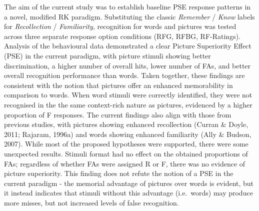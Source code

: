 \documentclass[
  11pt,
]{article}
\begin{document}
The aim of the current study was to establish baseline PSE response
patterns in a novel, modified RK paradigm. Substituting the classic
\emph{Remember} / \emph{Know} labels for \emph{Recollection} /
\emph{Familiarity}, recognition for words and pictures was tested across
three separate response option conditions (RFG, RFBG, RF-Ratings).
Analysis of the behavioural data demonstrated a clear Picture
Superiority Effect (PSE) in the current paradigm, with picture stimuli
showing better discrimination, a higher number of overall hits, lower
number of FAs, and better overall recognition performance than words.
Taken together, these findings are consistent with the notion that
pictures offer an enhanced memorability in comparison to words. When
word stimuli were correctly identified, they were not recognised in the
the same context-rich nature as pictures, evidenced by a higher
proportion of F responses. The current findings also align with those
from previous studies, with pictures showing enhanced recollection
(Curran \& Doyle, 2011; Rajaram, 1996a) and words showing enhanced
familiarity (Ally \& Budson, 2007). While most of the proposed
hypotheses were supported, there were some unexpected results. Stimuli
format had no effect on the obtained proportions of FAs; regardless of
whether FAs were assigned R or F, there was no evidence of picture
superiority. This finding does not refute the notion of a PSE in the
current paradigm - the memorial advantage of pictures over words is
evident, but it instead indicates that stimuli without this advantage
(i.e.~words) may produce more misses, but not increased levels of false
recognition.
\end{document}

